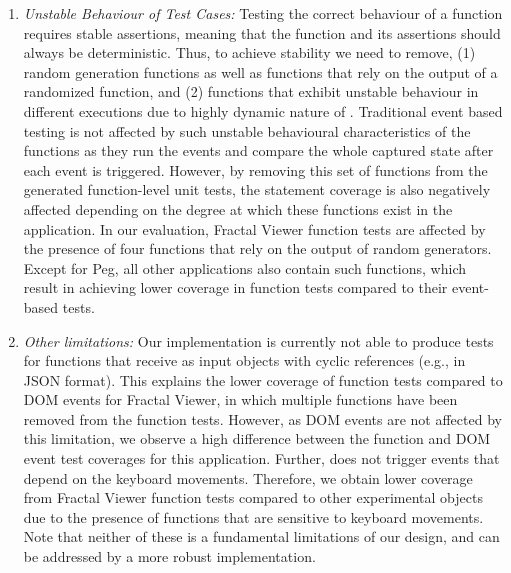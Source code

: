 \begin{enumerate}
\item \textit{Unstable Behaviour of Test Cases:} Testing the correct behaviour of a function requires stable assertions, meaning that
the function and its assertions should always be deterministic. 
Thus, to achieve stability we need to remove, (1)  random generation functions as well as functions that rely on the output of a randomized function, and (2) functions that exhibit unstable behaviour in different executions due to highly dynamic nature of \javascript. 
Traditional event based testing is not affected by such unstable behavioural characteristics of the functions as they run the events and compare the whole captured state after each event is triggered. However, by removing this set of functions from the generated function-level unit tests, the statement coverage is also negatively affected depending on the degree at which these functions exist in the application. In our evaluation, Fractal Viewer function tests are affected by the presence of four functions that rely on the output of random generators. Except for Peg, all other applications also contain such functions, which result in achieving lower coverage in function tests compared to their event-based tests.

\item \textit{Other limitations:} Our implementation is currently not able to produce tests for functions that receive as input \javascript objects with cyclic references (e.g., in JSON format). 
This explains the lower coverage of function tests compared to DOM events for Fractal Viewer, in which multiple functions have been removed from the function tests. However, as DOM events are not affected by this limitation, we observe a high difference between  the function and DOM event test coverages for this application. 
Further, \tool does not trigger events that depend on the keyboard movements. 
Therefore, we obtain lower coverage from Fractal Viewer function tests compared to other experimental objects due to the presence of functions that are sensitive to keyboard movements. Note that neither of these is 
a fundamental limitations of our design, and can be addressed by a more robust implementation. 
\end{enumerate}  


      